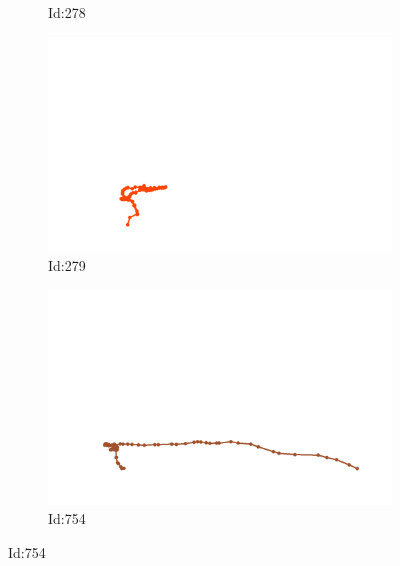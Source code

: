 \documentclass[12pt,twoside]{report}
\begin{document}
\begin{figure}
\begin{subfigure}[b]{0.20\textwidth}
\caption{Id:278}
\end{subfigure}
\begin{subfigure}[b]{0.20\textwidth}
\centering
\includegraphics[width=\textwidth]{../../trajectories/279.png}
\caption{Id:279}
\end{subfigure}
\begin{subfigure}[b]{0.20\textwidth}
\centering
\includegraphics[width=\textwidth]{../../trajectories/754.png}
\caption{Id:754}
\end{subfigure}
\end{figure}
\end{document}
